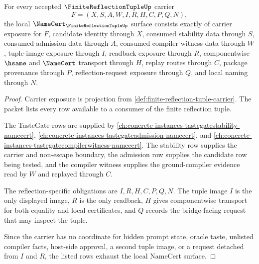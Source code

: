 \begin{theorem}
\label{thm:finite-reflection-tuple-namecert-obligations}
For every accepted $\FiniteReflectionTupleUp$ carrier
$$
F=(X,S,A,W,I,R,H,C,P,Q,N),
$$
the local $\NameCert_{\FiniteReflectionTupleUp}$ surface consists exactly of carrier exposure for $F$, candidate identity through $X$, consumed stability data through $S$, consumed admission data through $A$, consumed compiler-witness data through $W$, tuple-image exposure through $I$, readback exposure through $R$, componentwise $\hsame$ and $\NameCert$ transport through $H$, replay routes through $C$, package provenance through $P$, reflection-request exposure through $Q$, and local naming through $N$.
\end{theorem}
\begin{proof}
Carrier exposure is projection from \autoref{def:finite-reflection-tuple-carrier}. The packet lists every row available to a consumer of the finite reflection tuple.

The TasteGate rows are supplied by \autoref{ch:concrete-instances-tastegatestability-namecert}, \autoref{ch:concrete-instances-tastegateadmission-namecert}, and \autoref{ch:concrete-instances-tastegatecompilerwitness-namecert}. The stability row supplies the carrier and non-escape boundary, the admission row supplies the candidate row being tested, and the compiler witness supplies the ground-compiler evidence read by $W$ and replayed through $C$.

The reflection-specific obligations are $I,R,H,C,P,Q,N$. The tuple image $I$ is the only displayed image, $R$ is the only readback, $H$ gives componentwise transport for both equality and local certificates, and $Q$ records the bridge-facing request that may inspect the tuple.

Since the carrier has no coordinate for hidden prompt state, oracle taste, unlisted compiler facts, host-side approval, a second tuple image, or a request detached from $I$ and $R$, the listed rows exhaust the local NameCert surface.
\end{proof}

